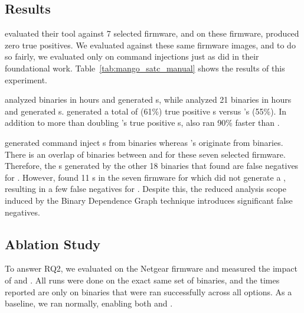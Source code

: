 \subsection{\satcHandPickDataset Results}
\label{sec:focused_eval}


\satc evaluated their tool against 7 selected firmware, and on these firmware, \karonte produced zero true positives.
We evaluated \mango against these same firmware images, and to do so fairly, we evaluated only on command injections just as \satc did in their foundational work.
Table~\ref{tab:mango_satc_manual} shows the results of this experiment.

\mango analyzed \satcManTotalBinAmount binaries in \mangoManTotalTimeHours hours and generated \mangoManTotalAlerts \trupoc{}s, while \satc analyzed 21 binaries in \satcManTotalTimeHours hours and generated \satcManTotalAlerts \trupoc{}s.
\mango generated a total of \mangoManTotalTP (61\%) true positive \trupoc{}s versus \satc's \satcManTotalTP (55\%).
In addition to more than doubling \satc's true positive \trupoc{}s, \mango also ran 90\% faster than \satc.
% 

\mango generated \mangoManTotalAlerts command inject \trupoc{}s from \mangoManTotalBins binaries whereas \satc's \satcManTotalAlerts originate from \satcManTotalBins binaries.
There is an overlap of \satcManTotalBins binaries between \mango and \satc for these seven selected firmware.
Therefore, the \trupoc{}s generated by the other 18 binaries that \mango found are false negatives for \satc.
However, \satc found 11 \trupoc{}s in the seven firmware for which \mango did not generate a \trupoc, resulting in a few false negatives for \mango.
Despite this, the reduced analysis scope induced by the Binary Dependence Graph technique introduces significant false negatives.




\subsection{Ablation Study}
\label{sec:ablation}


To answer RQ2, we evaluated \toolname on the Netgear firmware \ablationFirmware and measured the impact of \assumed and \rev.
All runs were done on the exact same set of binaries, and the times reported are only on binaries that were ran successfully across all options.
As a baseline, we ran \toolname normally, enabling both \assumed and \rev.

